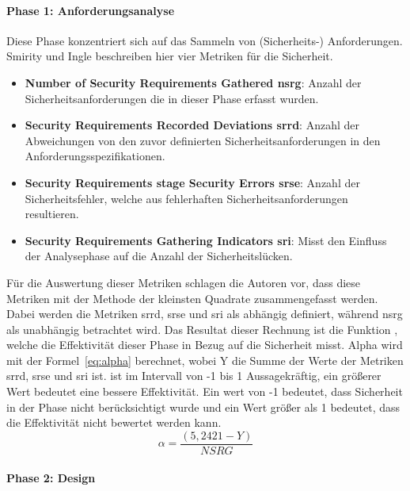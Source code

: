 \documentclass[12pt, a4paper, ngerman]{article}
\begin{document}
\paragraph{Phase 1: Anforderungsanalyse}

Diese Phase konzentriert sich auf das Sammeln von (Sicherheits-) Anforderungen.
Smirity und Ingle beschreiben hier vier Metriken für die Sicherheit.
\begin{itemize}
  \item \textbf{Number of Security Requirements Gathered \acs{nsrg}}: Anzahl der Sicherheitsanforderungen die in dieser Phase erfasst wurden.
  \item \textbf{Security Requirements Recorded Deviations \acs{srrd}}: Anzahl der Abweichungen von den zuvor definierten Sicherheitsanforderungen in den Anforderungsspezifikationen.
  \item \textbf{Security Requirements stage Security Errors \acs{srse}}: Anzahl der Sicherheitsfehler, welche aus fehlerhaften Sicherheitsanforderungen resultieren.
  \item \textbf{Security Requirements Gathering Indicators \acs{sri}}: Misst den Einfluss der Analysephase auf die Anzahl der Sicherheitslücken. 
\end{itemize}
Für die Auswertung dieser Metriken schlagen die Autoren vor, dass diese Metriken mit der Methode der kleinsten Quadrate zusammengefasst werden.
Dabei werden die Metriken \ac{srrd}, \ac{srse} und \ac{sri} als abhängig definiert, während \ac{nsrg} als unabhängig betrachtet wird.
Das Resultat dieser Rechnung ist die Funktion \alpha, welche die Effektivität dieser Phase in Bezug auf die Sicherheit misst.
Alpha wird mit der Formel~\ref{eq:alpha} berechnet, wobei Y die Summe der Werte der Metriken \ac{srrd}, \ac{srse} und \ac{sri} ist.
\alpha ist im Intervall von -1 bis 1 Aussagekräftig, ein größerer Wert bedeutet eine bessere Effektivität.
Ein wert von -1 bedeutet, dass Sicherheit in der Phase nicht berücksichtigt wurde 
und ein Wert größer als 1 bedeutet, dass die Effektivität nicht bewertet werden kann.
\begin{equation} \label{eq:alpha}
  \alpha = \frac{ \left( 5,2421 - Y \right) }{ NSRG }
\end{equation}

\paragraph{Phase 2: Design}
\end{document}
